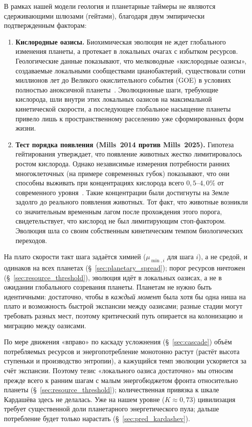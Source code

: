 \documentclass[12pt,a4paper]{article}
\begin{document}
В рамках нашей модели геология и планетарные таймеры не являются сдерживающими шлюзами (гейтами), благодаря двум эмпирически подтвержденным факторам:
\begin{enumerate}
   \item \textbf{Кислородные оазисы.} Биохимическая эволюция не ждет глобального изменения планеты, а протекает в локальных очагах с избытком ресурсов. Геологические данные показывают, что мелководные «кислородные оазисы», создаваемые локальными сообществами цианобактерий, существовали сотни миллионов лет до Великого окислительного события (GOE) в условиях полностью аноксичной планеты~\cite{Riding2014,Ostrander2019}. Эволюционные шаги, требующие кислорода, шли внутри этих локальных оазисов на максимальной кинетической скорости, а последующее глобальное насыщение планеты привело лишь к пространственному расселению уже сформированных форм жизни.
   \item \textbf{Тест порядка появления (Mills~2014 против Mills~2025).}  Гипотеза гейтирования утверждает, что появление животных жестко лимитировалось ростом кислорода. Однако независимые измерения потребности ранних многоклеточных (на примере современных губок) показывают, что они способны выживать при концентрациях кислорода всего $0{,}5$--$4{,}0\%$ от современного уровня~\cite{Mills2014}. Такие концентрации были достигнуты на Земле задолго до реального появления животных. Тот факт, что животные возникли со значительным временным лагом после прохождения этого порога, свидетельствует, что кислород не был лимитирующим стоп-фактором. Эволюция шла со своим собственным кинетическим темпом биологических переходов.
\end{enumerate}

\label{sec:plateau}
На плато скорости такт шага задаётся химией ($\mu_{\min,i}$ для шага $i$), а не средой, и одинаков на всех планетах (\S~\ref{sec:planetary_spread}); порог ресурсов ничтожен (\S~\ref{sec:resource_threshold}), эволюция идёт в локальных оазисах, а не в ожидании глобального созревания планеты. Планетам не нужно быть идентичными: достаточно, чтобы в \emph{каждый момент} была хотя бы одна ниша на плато и возможность быстрой экспансии между оазисами; разные стадии могут требовать разных мест, поэтому критический путь опирается на колонизацию и миграцию между оазисами.

По мере движения «вправо» по каскаду усложнения (\S~\ref{sec:cascade}) объём потребляемых ресурсов и энергопотребление монотонно растут (растёт высота ступеньки и производство энтропии), а кажущийся темп эволюции ускоряется за счёт экспансии. Поэтому тезис «локального оазиса достаточно» мы относим прежде всего к ранним шагам с малым энергобюджетом фронта относительно планеты (\S~\ref{sec:resource_threshold}); количественная привязка к шкале Кардашёва здесь не делалась. Уже на нашем уровне ($K \approx 0{,}73$) цивилизация требует существенной доли планетарного энергетического пула; дальше потребление будет только нарастать (\S~\ref{sec:pred_kardashev}).
\end{document}
